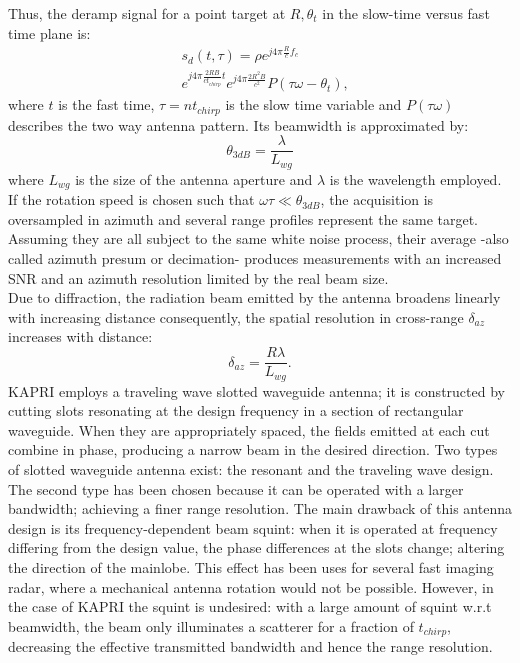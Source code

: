 Thus, the deramp signal for a point target at $R,\theta_t$ in the slow-time versus fast time plane is:
\begin{equation}\label{eq:signal_model}
	\begin{aligned}
	& s_{d}\left(t,\tau\right) = \rho e^{j 4 \pi \frac{ R}{c}f_c}   \\
	& e^{j 4 \pi \frac{2 R B }{c t_{chirp}} t}  e^{j 4 \pi \frac{2 R^2 B}{c^2}} P\left(\tau \omega - \theta_t\right),
	\end{aligned}
\end{equation} 
where $t$ is the fast time, $\tau = n t_{chirp}$ is the slow time variable and $P\left(\tau \omega\right)$ describes the two way antenna pattern. Its beamwidth is approximated by:
\begin{equation}\label{eq:azimuth_resolution}
	\theta_{3dB} = \frac{\lambda}{L_{wg}}
\end{equation}
where $L_{wg}$ is the size of the antenna aperture and $\lambda$ is the wavelength employed.
If the rotation speed is chosen such that $\omega \tau \ll \theta_{3dB}$, the acquisition is oversampled in azimuth and several range profiles represent the same target. Assuming they are all subject to the same white noise process, their average -also called azimuth presum or decimation- produces measurements with an increased SNR and an azimuth resolution limited by the real beam size.\\ 
Due to diffraction, the radiation beam emitted by the antenna broadens linearly with increasing distance consequently, the spatial resolution in cross-range $\delta_{az}$ increases with distance:
\begin{equation}\label{eq:azimuth_ground_resolution}
	\delta_{az} = \frac{R \lambda}{L_{wg}}.
\end{equation}
KAPRI employs a traveling wave slotted waveguide antenna\cite{Hines1953a,Granet2007}; it is constructed by cutting slots resonating at the design frequency in a section of rectangular waveguide. When they are appropriately spaced, the fields emitted at each cut combine in phase, producing a narrow beam in the desired direction. Two types of slotted waveguide antenna exist\cite{Enjiu2013}: the resonant and the traveling wave design. The second type has been chosen because it can be operated with a larger bandwidth; achieving a finer range resolution. The main drawback of this antenna design is its frequency-dependent beam squint: when it is operated at frequency differing from the design value, the phase differences at the slots change; altering the direction of the mainlobe. This effect has been uses for several fast imaging radar, where a mechanical antenna rotation would not be possible\cite{Yang2014,Yang2012,Mayer2003,Alvarez2013}. However, in the case of KAPRI the squint is undesired: with a large amount of squint w.r.t beamwidth, the beam only illuminates a scatterer for a fraction of $t_{chirp}$, decreasing the effective transmitted bandwidth and hence the range resolution. \\ 
